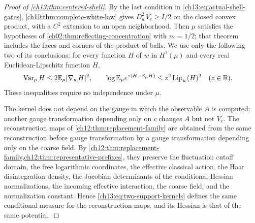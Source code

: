 \begin{proof}[Proof of \cref{ch13:thm:centered-shell}]
By the last condition in \eqref{ch13:eq:actual-shell-gates}, \cref{ch10:thm:complete-white-law} gives $D_w^2V_c\ge I/2$ on the closed convex product, with a $C^2$ extension to an open neighborhood. Then $\mu$ satisfies the hypotheses of \cref{ch02:thm:reflecting-concentration} with $m=1/2$; that theorem includes the faces and corners of the product of balls. We use only the following two of its conclusions: for every function $H$ of $w$ in $H^1(\mu)$ and every real Euclidean-Lipschitz function $H$,
\begin{equation}\label{ch13:eq:shell-product-inequalities}
 \operatorname{Var}_\mu H\le2\mathbb E_\mu\lvert \nabla_wH\rvert^2,\qquad
 \log\mathbb E_\mu e^{z(H-\mathbb E_\mu H)}\le z^2\operatorname{Lip}_w(H)^2\quad(z\in\mathbb R).
\end{equation}
These inequalities require no independence under $\mu$.

The kernel does not depend on the gauge in which the observable $A$ is computed: another gauge transformation depending only on $c$ changes $A$ but not $V_c$. The reconstruction maps of \cref{ch12:thm:replacement-family} are obtained from the same reconstruction before gauge transformation by a gauge transformation depending only on the coarse field. By \cref{ch12:thm:replacement-family,ch12:thm:representative-prefixes}, they preserve the fluctuation cutoff domain, the free logarithmic coordinates, the effective classical action, the Haar disintegration density, the Jacobian determinants of the conditional Hessian normalizations, the incoming effective interaction, the coarse field, and the normalization constant. Hence \eqref{ch13:eq:two-support-kernels} defines the same conditional measure for the reconstruction maps, and its Hessian is that of the same potential.


\end{proof}
